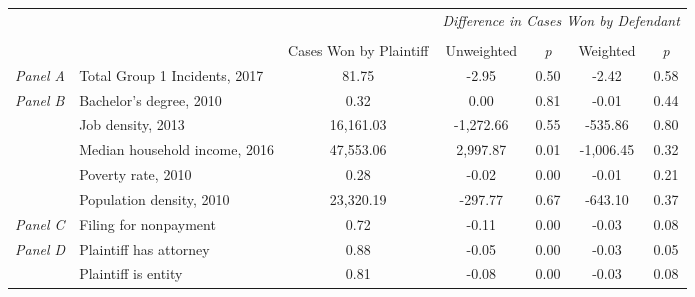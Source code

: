 \begin{tabular}{llccccc}
\toprule
 &  & \textit{} & \multicolumn{4}{c}{\textit{Difference in Cases Won by Defendant}} \\
\cline{4-7}
\\
 &  & Cases Won by Plaintiff & Unweighted & \emph{p} & Weighted & \emph{p} \\
\midrule
\textit{Panel A} & Total Group 1 Incidents, 2017 & 81.75 & -2.95 & 0.50 & -2.42 & 0.58 \\
\cline{1-7}
\multirow[c]{5}{.75cm}{\textit{Panel B}} & Bachelor's degree, 2010 & 0.32 & 0.00 & 0.81 & -0.01 & 0.44 \\
 & Job density, 2013 & 16,161.03 & -1,272.66 & 0.55 & -535.86 & 0.80 \\
 & Median household income, 2016 & 47,553.06 & 2,997.87 & 0.01 & -1,006.45 & 0.32 \\
 & Poverty rate, 2010 & 0.28 & -0.02 & 0.00 & -0.01 & 0.21 \\
 & Population density, 2010 & 23,320.19 & -297.77 & 0.67 & -643.10 & 0.37 \\
\cline{1-7}
\textit{Panel C} & Filing for nonpayment & 0.72 & -0.11 & 0.00 & -0.03 & 0.08 \\
\cline{1-7}
\multirow[c]{2}{.75cm}{\textit{Panel D}} & Plaintiff has attorney & 0.88 & -0.05 & 0.00 & -0.03 & 0.05 \\
 & Plaintiff is entity & 0.81 & -0.08 & 0.00 & -0.03 & 0.08 \\
\cline{1-7}
\bottomrule
\end{tabular}
